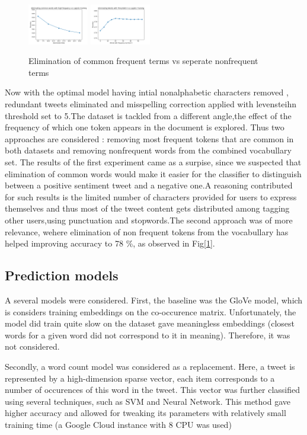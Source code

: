 \documentclass[10pt,conference,compsocconf]{IEEEtran}
\begin{document}
\begin{figure}[!htb]
	\centering \includegraphics[width=100px]{../plots/commonElem.png}
	\centering \includegraphics[width=100px]{../plots/nonfrequent.png}
	\caption{Elimination of common frequent terms vs seperate nonfrequent terms}
	\label{freq}
\end{figure}
Now with the optimal model having intial nonalphabetic characters removed , redundant tweets eliminated and misspelling correction applied with levensteihn threshold set to 5.The dataset is tackled from a different angle,the effect of the frequency of which one token appears in the document is explored. Thus two approaches are considered : removing most frequent tokens that are common in both datasets and removing nonfrequent words from the combined vocabullary set. The results of the first experiment came as a surpise, since we suspected that elimination of common words would make it easier for the classifier to distinguish between a positive sentiment tweet and a negative one.A reasoning contributed for such results is the limited number of characters provided for users to express themselves and thus most of the tweet content gets distributed among tagging other users,using punctuation and stopwords.The second approach was of more relevance, wehere elimination of non frequent tokens from the vocabullary has helped improving accuracy to 78 \%, as observed in Fig[\ref{freq}].    

\subsection{Prediction models}
A several models were considered.
First, the baseline was the GloVe \cite{glove} model, which is considers training embeddings on the co-occurence matrix.
Unfortunately, the model did train quite slow on the dataset gave meaningless embeddings (closest words for a given word did not correspond to it in meaning).
Therefore, it was not considered.

Secondly, a word count model was considered as a replacement.
Here, a tweet is represented by a high-dimension sparse vector, each item corresponds to a number of occurences of this word in the tweet.
This vector was further classified using several techniques, such as SVM and Neural Network.
This method gave higher accuracy and allowed for tweaking its parameters with relatively small training time (a Google Cloud instance with 8 CPU was used)
\vspace{5mm} %
\end{document}
